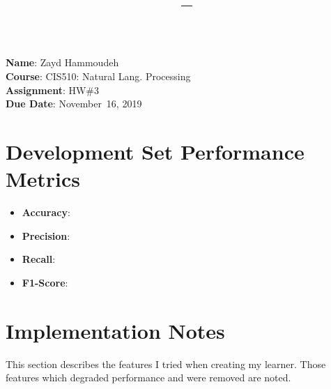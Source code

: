 \documentclass{article}
\title{\textbf{\course\ -- \assnName}}
\author{\name}
\newcommand{\name}{Zayd Hammoudeh}
\newcommand{\course}{CIS510: Natural Lang. Processing}
\newcommand{\assnName}{HW\#3}
\newcommand{\dueDate}{November~16, 2019}
\begin{document}

  \noindent
  \textbf{Name}: \name\\
  \textbf{Course}: \course\\
  \textbf{Assignment}: \assnName\\
  \textbf{Due Date}: \dueDate


  \section{Development Set Performance Metrics}

  \begin{itemize}
    \setlength{\itemsep}{0pt}
    \item \textbf{Accuracy}: 
    \item \textbf{Precision}: 
    \item \textbf{Recall}: 
    \item \textbf{F1-Score}: 
  \end{itemize}

  \section{Implementation Notes}

  This section describes the features I tried when creating my learner.  Those features which degraded performance and were removed are noted.
\end{document}
